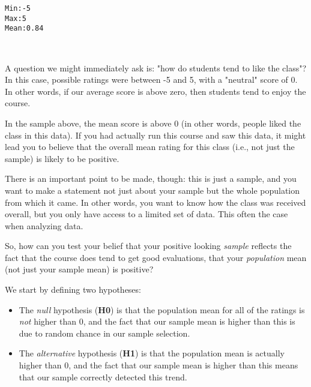 \documentclass[11pt]{article}
\providecommand{\tightlist}{%
      \setlength{\itemsep}{0pt}\setlength{\parskip}{0pt}}
\begin{document}
    \begin{Verbatim}[commandchars=\\\{\}]
Min:-5
Max:5
Mean:0.84

    \end{Verbatim}

    \begin{center}
    \end{center}
    { \hspace*{\fill} \\}
    
    A question we might immediately ask is: "how do students tend to like
the class"? In this case, possible ratings were between -5 and 5, with a
"neutral" score of 0. In other words, if our average score is above
zero, then students tend to enjoy the course.

In the sample above, the mean score is above 0 (in other words, people
liked the class in this data). If you had actually run this course and
saw this data, it might lead you to believe that the overall mean rating
for this class (i.e., not just the sample) is likely to be positive.

There is an important point to be made, though: this is just a sample,
and you want to make a statement not just about your sample but the
whole population from which it came. In other words, you want to know
how the class was received overall, but you only have access to a
limited set of data. This often the case when analyzing data.

So, how can you test your belief that your positive looking
\emph{sample} reflects the fact that the course does tend to get good
evaluations, that your \emph{population} mean (not just your sample
mean) is positive?

We start by defining two hypotheses:

\begin{itemize}
\tightlist
\item
  The \emph{null} hypothesis (\textbf{H0}) is that the population mean
  for all of the ratings is \emph{not} higher than 0, and the fact that
  our sample mean is higher than this is due to random chance in our
  sample selection.
\item
  The \emph{alternative} hypothesis (\textbf{H1}) is that the population
  mean is actually higher than 0, and the fact that our sample mean is
  higher than this means that our sample correctly detected this trend.
\end{itemize}
\end{document}
